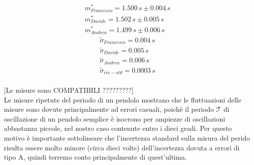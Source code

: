\documentclass[12pt, twoside, a4paper]{article}
\begin{document}
\begin{equation*}
	\begin{split}
		m_{Francesco}^* = 1.500\,s \pm 0.004\,s \\
		m_{Davide}^* = 1.502\,s \pm 0.005\,s \\
		m_{Andrea}^* = 1.499\,s \pm 0.006\,s
	\end{split}
\end{equation*}
\begin{equation*}
	\begin{split}
		\tilde{\sigma}_{Francesco} = 0.004\,s \\
		\tilde{\sigma}_{Davide} = 0.005\,s \\
		\tilde{\sigma}_{Andrea} = 0.006\,s \\
		\tilde{\sigma}_{ris-std} = 0.0003\,s
	\end{split}
\end{equation*}\\

[Le misure sono COMPATIBILI ?????????]\\

Le misure ripetute del periodo di un pendolo mostrano che le fluttuazioni delle misure sono dovute principalmente ad errori casuali, poichè il periodo $\mathcal{T}$ di oscillazione di un pendolo semplice è isocrono per ampiezze di oscillazioni abbastanza piccole, nel nostro caso contenute entro i dieci gradi.
Per questo motivo è importante sottolineare che l'incertezza standard sulla misura del perido risulta essere molto minore (circa dieci volte) dell'incertezza dovuta a errori di tipo A, quindi terremo conto principalmente di quest'ultima.\\
\end{document}
